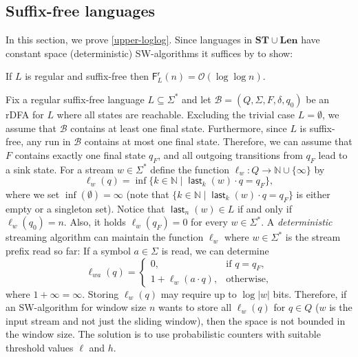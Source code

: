 \documentclass{theoretics}
\newcommand{\N}{\mathbb{N}}
\newcommand{\B}{\mathcal{B}}
\renewcommand{\O}{\mathcal{O}}
\newcommand{\F}{\mathsf{F}}
\renewcommand{\r}{\mathsf{r}}
\DeclareMathOperator{\last}{\mathsf{last}}
\newcommand{\Len}{\mathbf{Len}}
\newcommand{\ST}{\mathbf{ST}}
\begin{document}
\subsection{Suffix-free languages} \label{sec-random-suffix-free}

In this section, we prove \ref{upper-loglog}.
Since languages in $\ST \cup \Len$ have constant space (deterministic) SW-algorithms
it suffices by   to show:
\begin{theorem}
	\label{thm:sf-loglog}
	If $L$ is regular and suffix-free then $\F^\r_L(n) = \O(\log \log n)$.
\end{theorem}

Fix a regular suffix-free language $L \subseteq \Sigma^*$ and
let $\B = (Q,\Sigma,F,\delta,q_0)$ be an rDFA for $L$ where all states are reachable.
Excluding the trivial case $L = \emptyset$, we assume that $\B$ contains at least one final state.
Furthermore, since $L$ is suffix-free, any run in $\B$ contains at most one final state.
Therefore, we can assume that $F$ contains exactly one final state $q_F$, and all outgoing transitions
from $q_F$ lead to a sink state.
For a stream $w \in \Sigma^*$ define the function $\ell_w \colon Q \to \N \cup \{ \infty \}$ by
\begin{equation}
 \ell_w(q) = \inf \{  k \in \N \mid \last_k(w) \cdot q = q_F \}, \label{def-l_q(w)}
\end{equation}
where we set $\inf(\emptyset) = \infty$ (note that $\{  k \in \N \mid \last_k(w) \cdot q = q_F \}$ is either empty or a singleton set).
Notice that $\last_n(w) \in L$ if and only if $\ell_{w}(q_0) = n$. Also, it holds $\ell_w(q_F) = 0$ for every $w \in \Sigma^*$.
A {\em deterministic} streaming algorithm can maintain the function $\ell_w$ where $w \in \Sigma^*$ is
the stream prefix read so far:
If a symbol $a \in \Sigma$ is read, we can determine
\begin{equation}
	\label{eq:maintain-ellw}
	\ell_{wa}(q) = \begin{cases}
	0, & \text{if } q = q_F, \\
	1 + \ell_w(a \cdot q), & \text{otherwise,}
	\end{cases}
\end{equation}
where $1 + \infty = \infty$.
Storing $\ell_w(q)$ may require up to $\log |w|$ bits. Therefore, if an SW-algorithm for window size $n$
wants to store all $\ell_w(q)$ for $q \in Q$ ($w$ is the input stream and not just the sliding window), then the space is not bounded in the window size. 
The solution is to use probabilistic counters with suitable threshold values $\ell$ and $h$.
\end{document}
